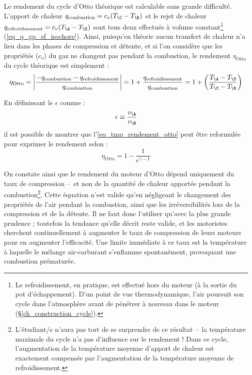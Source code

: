 		Le rendement du cycle d’Otto théorique est calculable sans grande difficulté. L’apport de chaleur $q_\text{combustion} = c_v (T_\C - T_\B )$ et le rejet de chaleur $q_\text{refroidissement} = c_v (T_\A - T_\D)$ sont tous deux effectués à volume constant\footnote{Le refroidissement, en pratique, est effectué hors du moteur (à la sortie du pot d’échappement). D’un point de vue thermodynamique, l’air poursuit son cycle dans l’atmosphère avant de pénétrer à nouveau dans le moteur (\S\ref{ch_construction_cycle}).} (\ref{eq_q_gp_sf_isochore}). Ainsi, puisqu’en théorie aucun transfert de chaleur n’a lieu dans les phases de compression et détente, et si l’on considère que les propriétés ($c_v$) du gaz ne changent pas pendant la combustion, le rendement $\eta_\text{Otto}$ du cycle théorique est simplement :
		\begin{equation}
			\eta_\text{Otto} = \left| \frac{-q_\text{combustion} - q_\text{refroidissement}}{q_\text{combustion}} \right| = 1 + \frac{q_\text{refroidissement}}{q_\text{combustion}} = 1 + \left( \frac{T_\A - T_\D}{T_\C - T_\B } \right) \label{eq_tmp_rendement_otto}
		\end{equation}

		En définissant le  $\epsilon$ comme :
		\begin{equation}
			\epsilon \equiv \frac{v_\A}{v_\B}
		\end{equation}
		il est possible de montrer que l’\cref{eq_tmp_rendement_otto} peut être reformulée pour exprimer le rendement selon :
		\begin{equation}
			\eta_\text{Otto} = 1 - \frac{1}{\epsilon^{\gamma -1}}
		\end{equation}

		On constate ainsi que le rendement du moteur d’Otto dépend uniquement du taux de compression --\ et non de la quantité de chaleur apportée pendant la combustion\footnote{L’étudiant/e n’aura pas tort de se surprendre de ce résultat --\ la température maximale du cycle n’a pas d’influence sur le rendement ! Dans ce cycle, l’augmentation de la température moyenne d’apport de chaleur est exactement compensée par l’augmentation de la température moyenne de refroidissement.}. Cette équation n’est valide qu’en négligeant le changement des propriétés de l’air pendant la combustion, ainsi que les irréversibilités lors de la compression et de la détente. Il ne faut donc l’utiliser qu’avec la plus grande prudence ; toutefois la tendance qu’elle décrit reste valide, et les motoristes cherchent continuellement à augmenter le taux de compression de leurs moteurs pour en augmenter l’efficacité. Une limite immédiate à ce taux est la température à laquelle le mélange air-carburant s’enflamme spontanément, provoquant une combustion prématurée.

